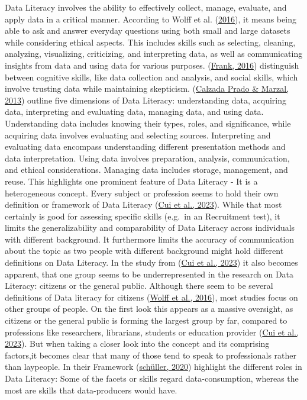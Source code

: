 \documentclass[
  12pt,
  a4paper,
  twoside]{article}
\begin{document}
Data Literacy involves the ability to effectively collect, manage, evaluate, and apply data in a critical manner. According to Wolff et al. (\protect\hyperlink{ref-wolff2016}{2016}), it means being able to ask and answer everyday questions using both small and large datasets while considering ethical aspects. This includes skills such as selecting, cleaning, analyzing, visualizing, criticizing, and interpreting data, as well as communicating insights from data and using data for various purposes. (\protect\hyperlink{ref-frank2016}{Frank, 2016}) distinguish between cognitive skills, like data collection and analysis, and social skills, which involve trusting data while maintaining skepticism. (\protect\hyperlink{ref-prado2013}{Calzada Prado \& Marzal, 2013}) outline five dimensions of Data Literacy: understanding data, acquiring data, interpreting and evaluating data, managing data, and using data. Understanding data includes knowing their types, roles, and significance, while acquiring data involves evaluating and selecting sources. Interpreting and evaluating data encompass understanding different presentation methods and data interpretation. Using data involves preparation, analysis, communication, and ethical considerations. Managing data includes storage, management, and reuse.
This highlights one prominent feature of Data Literacy - It is a heterogeneous concept. Every subject or profession seems to hold their own definition or framework of Data Literacy (\protect\hyperlink{ref-Cui2023}{Cui et al., 2023}). While that most certainly is good for assessing specific skills (e.g.~in an Recruitment test), it limits the generalizability and comparability of Data Literacy across individuals with different background. It furthermore limits the accuracy of communication about the topic as two people with different background might hold different definitions on Data Literacy.
In the study from (\protect\hyperlink{ref-Cui2023}{Cui et al., 2023}) it also becomes apparent, that one group seems to be underrepresented in the research on Data Literacy: citizens or the general public.
Although there seem to be several definitions of Data literacy for citizens (\protect\hyperlink{ref-wolff2016}{Wolff et al., 2016}), most studies focus on other groups of people. On the first look this appears as a massive oversight, as citizens or the general public is forming the largest group by far, compared to professions like researchers, librarians, students or education provider (\protect\hyperlink{ref-Cui2023}{Cui et al., 2023}). But when taking a closer look into the concept and its comprising factors,it becomes clear that many of those tend to speak to professionals rather than laypeople. In their Framework (\protect\hyperlink{ref-schuxfcller2020}{schüller, 2020}) highlight the different roles in Data Literacy: Some of the facets or skills regard data-consumption, whereas the most are skills that data-producers would have.
\end{document}
